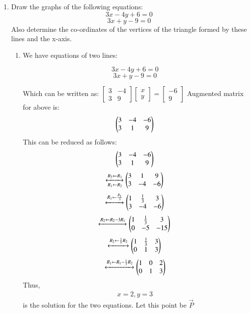 \documentclass[journal,12pt,twocolumn]{IEEEtran}
\renewcommand\thesection{\arabic{section}}
\begin{document}
\begin{enumerate}[label=\thesection.\arabic*.,ref=\thesection.\theenumi]
\item Draw the graphs of the following equations: 
\[ 3x-4y+6=0 \]
\[ 3x+y-9=0 \]
Also determine the co-ordinates of the vertices of the triangle formed by these lines and the x-axis.\\
\solution\begin{enumerate}
    \item We have equations of two lines:

    $$3x-4y+6=0$$
    $$3x+y-9=0 $$

Which can be written as:
$
\begin{bmatrix}
  3 & -4 \\ 3 & 9
\end{bmatrix}
\begin{bmatrix}
  x \\ y
\end{bmatrix}
=
\begin{bmatrix}
  -6 \\ 9
\end{bmatrix}
$
Augmented matrix for above is:
\begin{align}
    \begin{pmatrix}3 & -4 & -6\\
           3 & 1 & 9\end{pmatrix}
\end{align}
This can be reduced as follows:
 \[\begin{pmatrix}3 & -4 & -6\\
           3 & 1 & 9\end{pmatrix}\]\[
    \xleftrightarrow[R_1 \leftarrow R_2]
    {R_2 \leftarrow R_1}
    \begin{pmatrix}3 & 1 & 9\\
          3 & -4 & -6\end{pmatrix}\\\]\[
          \xleftrightarrow{R_1 \leftarrow \frac{R_1}{3}}
    \begin{pmatrix}1 &\frac{1}{3}&3\\
        3&-4&-6\end{pmatrix}\\\]\[
        \xleftrightarrow{R_2\leftarrow R_2-3R_1}
    \begin{pmatrix}1&\frac{1}{3}&3\\0&-5&-15\end{pmatrix}\\\]\[
    \xleftrightarrow{R_2\leftarrow \frac{1}{5}R_2}
    \begin{pmatrix}1&\frac{1}{3}&3\\0&1&3\end{pmatrix}\\\]\[
    \xleftrightarrow{R_1\leftarrow R_1-\frac{1}{3}R_2}
    \begin{pmatrix}1&0&2\\0&1&3\end{pmatrix}\]
Thus,
\begin{align}
    x=2, y=3
\end{align} 
is the solution for the two equations. 
Let this point be $\vec{P}$
\begin{align}

\end{align}
\end{enumerate}
\end{enumerate}
\end{document}
